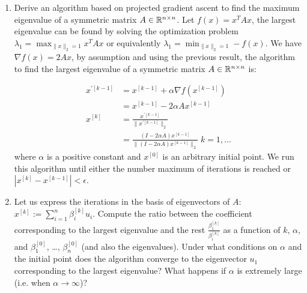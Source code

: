 \documentclass[12pt,twoside]{article}
\begin{document}
\begin{enumerate}
\begin{enumerate}
\item Derive an algorithm based on projected gradient ascent to find the maximum eigenvalue of a symmetric matrix $A\in \mathbb{R}^{n \times n}$.
Let $f(x) = x^T A x$, the largest eigenvalue can be found by solving the optimization problem $\lambda_1= \max _{\|x\|_2=1} x^T A x$ or equivalently $\lambda_1 = \min_{\|x\|_2=1}  - f(x)$.
We have $\nabla{f(x)} = 2 A x$, by assumption and using the previous result, the algorithm to find the largest eigenvalue of a symmetric matrix $A\in \mathbb{R}^{n \times n}$ is:

\begin{align*}
	x^{'[k-1]}	&= x^{[k-1]} + \alpha \nabla{f(x^{[k-1]} )} \\
			&= x^{[k-1]} -2 \alpha A x^{[k-1]} \\
	x^{[k]}	&= \frac{x^{'[k-1]}}{\|x^{'[k-1]}\|_2} \\
			&= \frac{(I - 2 \alpha A) x^{[k-1]}}{ \| (I - 2 \alpha A) x^{[k-1]} \|_2} \; k=1, \ldots
\end{align*}
where $\alpha$ is a positive constant and $x^{[0]}$ is an arbitrary initial point.
We run this algorithm until either the number maximum of iterations is reached or $|x^{[k]} - x^{[k-1]}| < \epsilon$.


\item Let us express the iterations in the basis of eigenvectors of $A$: $x^{[k]} := \sum_{i=1}^{n}\beta_i^{[k]} u_i$. Compute the ratio between the coefficient corresponding to the largest eigenvalue and the rest $\frac{\beta_1^{[k]}}{\beta_i^{[k]}}$ as a function of $k$, $\alpha$, and $\beta_1^{[0]}$, \ldots, $\beta_n^{[0]}$  (and also the eigenvalues). Under what conditions on $\alpha$ and the initial point does the algorithm converge to the eigenvector $u_1$ corresponding to the largest eigenvalue? What happens if $\alpha$ is extremely large (i.e. when $\alpha \rightarrow \infty$)?



\end{enumerate}
\end{enumerate}
\end{document}
